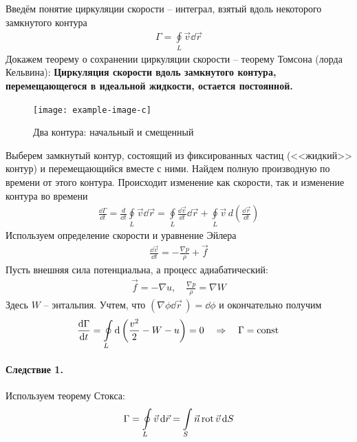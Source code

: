 Введём понятие циркуляции скорости -- интеграл, взятый вдоль некоторого замкнутого контура
\begin{align*}
\Gamma = \oint \limits_ { L } \vec{v} \dd{\vec{r}}
\end{align*}
Докажем теорему о сохранении циркуляции скорости -- теорему Томсона (лорда Кельвина):
\textbf{Циркуляция скорости вдоль замкнутого контура, перемещающегося в идеальной жидкости, остается постоянной.}
\begin{figure}[h]
	\centering
	\texttt{[image: example-image-c]}
	\caption{Два контура: начальный и смещенный}
	\label{fig:figure13}
\end{figure}
Выберем замкнутый контур, состоящий из фиксированных частиц (<<жидкий>> контур) и перемещающийся вместе с ними.  Найдем полную производную по времени от этого контура. Происходит изменение как скорости, так и изменение контура во времени
\begin{align*}
\frac{\dd \Gamma}{\dd t}=\frac{d}{\dd t} \oint\limits_{L} \vec{v} \dd \vec{r}=\oint\limits_{L} \frac{\dd \vec{v}}{\dd t} \dd \vec{r}+\oint\limits_L \vec{v}\, d\left(\frac{\dd \vec{r}}{\dd t}\right)
\end{align*}
%
Используем определение скорости и уравнение Эйлера
\begin{align*}
\frac { \dd \vec{v}  } { \dd t } = - \frac { \nabla p } { \rho } + \vec { f }
\end{align*}
%
Пусть внешняя сила потенциальна, а процесс адиабатический:
\begin{align*}
{ \vec { f } = - \nabla u }, \quad
{ \frac { \nabla p } { \rho } = \nabla W }
\end{align*}
Здесь $W$ -- энтальпия.  Учтем, что $ ( \nabla \phi \dd{\vec{r}}\, ) = \dd \phi $ и окончательно получим
\begin{align*}
\frac { \dd \Gamma } { \dd t } = \oint\limits _ { L } \dd \left( \frac { v ^ { 2 } } { 2 } - W - u \right) = 0 \quad \Rightarrow \quad  \Gamma = \mathrm{const}\,
\end{align*}

\paragraph{Следствие 1.} Используем теорему Стокса:
\begin{align*}
\Gamma = \oint \limits_ { L } \vec{v} \dd{\vec{r}} = \int \limits_ { S } \vec { n }\operatorname{rot}\vec{v}\dd{S}
\end{align*}

